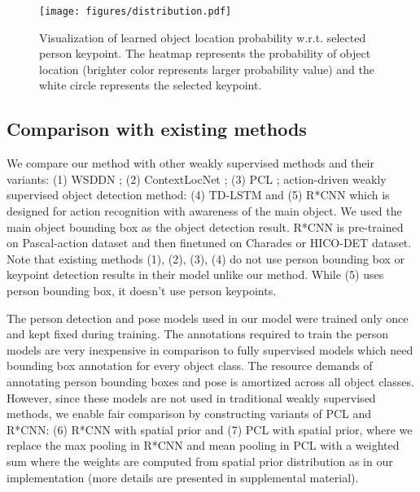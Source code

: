 \documentclass[10pt,twocolumn,letterpaper]{article}
\begin{document}
\begin{figure}
\centering
\vspace{-0.4\baselineskip}
\texttt{[image: figures/distribution.pdf]}
\caption{Visualization of learned object location probability w.r.t. selected person keypoint. The heatmap represents the probability of object location (brighter color represents larger probability value) and the white circle represents the selected keypoint.}
\label{fig:distribution}
\vspace{-0.3\baselineskip}
\end{figure}


\vspace{-0.6\baselineskip}
\subsection{Comparison with existing methods}
\vspace{-0.4\baselineskip}
We compare our method with other weakly supervised methods and their variants: (1) WSDDN \cite{bilen2016weakly}; (2) ContextLocNet \cite{kantorov2016contextlocnet}; (3) PCL \cite{tang2018pcl}; action-driven weakly supervised object detection method: (4) TD-LSTM \cite{yuan2017temporal} and (5) R*CNN \cite{gkioxari2015contextual} which is designed for action recognition with awareness of the main object. We used the main object bounding box as the object detection result. R*CNN is pre-trained on Pascal-action dataset and then finetuned on Charades or HICO-DET dataset. Note that existing methods (1), (2), (3), (4) do not use person bounding box or keypoint detection results in their model unlike our method. While (5) uses person bounding box, it doesn't use person keypoints.

The person detection and pose models used in our model were trained only once and kept fixed during training. The annotations required to train the person models are very inexpensive in comparison to fully supervised models which need bounding box annotation for every object class. The resource demands of annotating person bounding boxes and pose is amortized across all object classes. However, since these models are not used in traditional weakly supervised methods, we enable fair comparison by constructing variants of PCL and R*CNN: (6) R*CNN with spatial prior and (7) PCL with spatial prior, where we replace the max pooling in R*CNN and mean pooling in PCL with a weighted sum where the weights are computed from spatial prior distribution as in our implementation (more details are presented in supplemental material).
\end{document}
